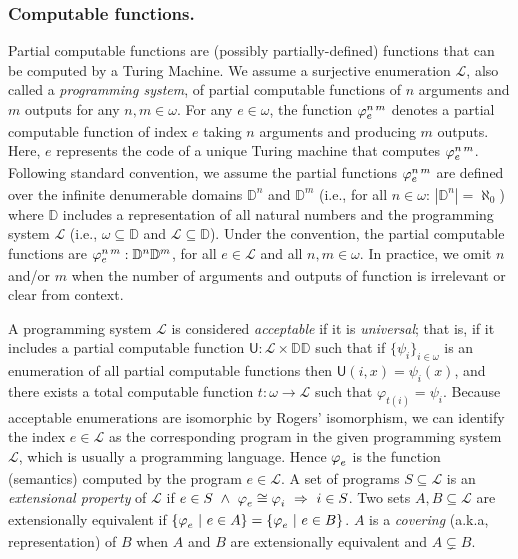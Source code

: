 \documentclass[runningheads]{llncs}
\makeatletter
\def\ok#1{\mbox{\raisebox{0ex}[1ex][1ex]{$#1$}}}
\newcommand{\Interp}{\mathsf{U}}
\newcommand{\ccL}{\mathscr{L}}
\newcommand{\Domain}{\mathbb{D}}
\newcommand{\pfunction}[3]{\ok{\varphi^{#2\, #3}_{#1}}}
\newcommand{\ra}{\rightarrow}
\newcommand{\Ra}{\Rightarrow}
\def\ok#1{\mbox{\raisebox{0ex}[1ex][1ex]{$#1$}}}
\newcommand{\sset}[2]{\{#1  ~|~ #2\}}
\newcommand{\nat}{\omega}
\newcommand{\pto}{}%
\DeclareRobustCommand{\pto}{\mathrel{\mathpalette\p@to@gets\to}}
\newcommand{\p@to@gets}[2]{%
  \ooalign{\hidewidth$\m@th#1\mapstochar\mkern5mu$\hidewidth\cr$\m@th#1\to$\cr}%
}
\makeatother
\begin{document}
\subsubsection{Computable functions.}
Partial computable functions are (possibly partially-defined) functions that can
be computed by a Turing Machine. We assume a surjective enumeration
$\ccL$, also called a {\em programming system\/}, of partial computable functions
of $n$ arguments and $m$ outputs for any $n,m\in\nat$. For any $e\in\nat$, the
function $\pfunction{e}{n}{m}$ denotes a partial computable function of index $e$ taking $n$ arguments and producing $m$ outputs. Here, $e$ represents the code of a unique Turing machine that computes $\pfunction{e}{n}{m}$.
Following standard convention, we assume the partial functions $\pfunction{e}{n}{m}$ are defined over the infinite denumerable domains $\Domain^n$ and $\Domain^m$
(i.e., for all $n\in\omega:\,|\Domain^n|=\aleph_0$) where \(\Domain\) includes
a representation of all natural numbers and the programming system $\ccL$ (i.e.,
$\nat \subseteq \Domain$ and $\ccL\subseteq\Domain$). Under the convention, the
partial computable functions are $\pfunction{e}{n}{m}: \Domain^n \pto \Domain^m$,
for all $e\in\ccL$ and all $n,m\in\nat$. In practice, we omit $n$ and/or $m$ when
the number of arguments and outputs of function is irrelevant or clear from context. 

A programming system $\ccL$ is considered {\em acceptable\/} if 
it is {\em universal\/}; that is, if it includes a partial computable function $\Interp:\ccL\times\Domain\pto\Domain$ such that if $\{\psi_i\}_{i\in\omega}$ is an enumeration of all partial computable functions then $\Interp(i,x)=\psi_{i}(x)$, and 
there exists a total computable function $t:\omega\ra\ccL$ such that $\varphi_{t(i)}=\psi_{i}$.
Because acceptable enumerations are isomorphic by Rogers' isomorphism, we can identify the index $e\in \ccL$ as the corresponding program in the given programming system $\ccL$, which is usually a programming language. Hence 
$\pfunction{e}{}{}$ is the function (semantics) computed by the program $e\in\ccL$.
A set of programs $S\subseteq\ccL$ is an {\em extensional property\/} of $\ccL$ if 
$e\in S~\wedge~\pfunction{e}{}{}\cong\pfunction{i}{}{}~\Ra~i\in S$. Two sets $A,B\subseteq\ccL$ are extensionally equivalent if 
$\sset{\pfunction{e}{}{}}{e\in A}=\sset{\pfunction{e}{}{}}{e\in B}$. $A$ is a {\em covering\/} (a.k.a, representation) of 
$B$ when $A$ and $B$ are extensionally equivalent and $A\subsetneq B$. 
\end{document}
